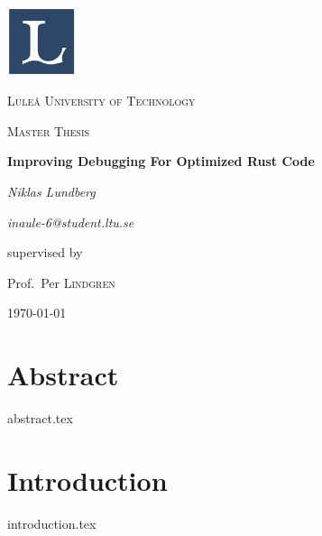\documentclass[12pt, a4paper]{article}
\begin{document}
%

\begin{titlepage}
    \centering
    \includegraphics[width=0.15\textwidth]{ltulogo.png}\par\vspace{1cm}
    {\scshape\LARGE Luleå University of Technology\par}
    \vspace{1cm}
    {\scshape\Large Master Thesis\par}
    \vspace{1.5cm}
    {\huge\bfseries Improving Debugging For Optimized Rust Code\par}
    \vspace{2cm}
    {\Large\textit{Niklas Lundberg}\par}
    {\Large\textit{inaule-6@student.ltu.se}\par}
    \vfill
    supervised by\par
    Prof.~Per \textsc{Lindgren}
    \vfill
    {\large \today\par}
\end{titlepage}


\section{Abstract}
\label{sec:abstract}
{abstract.tex}

\newpage
\tableofcontents 
\clearpage

\printglossary[type=\acronymtype]
\label{sec:acronym}
\clearpage

\section{Introduction}
\label{sec:introfuction}
{introduction.tex}
\end{document}
